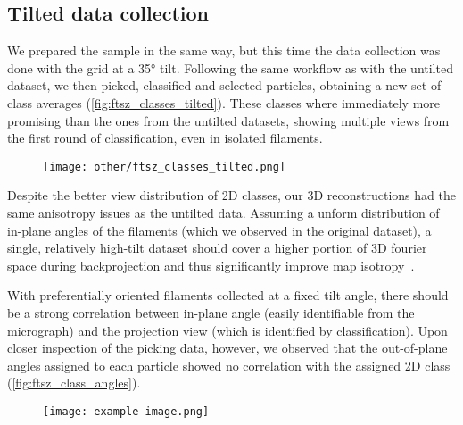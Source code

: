 \subsection{Tilted data collection}\label{ftsz_tilted}

We prepared the sample in the same way, but this time the data collection was done with the grid at a 35° tilt.
Following the same workflow as with the untilted dataset, we then picked, classified and selected particles, obtaining a new set of class averages (\autoref{fig:ftsz_classes_tilted}).
These classes where immediately more promising than the ones from the untilted datasets, showing multiple views from the first round of classification, even in isolated filaments. %

\begin{figure}[ht]
    \centering
    \texttt{[image: other/ftsz\_classes\_tilted.png]}
    \label{fig:ftsz_classes_tilted}
\end{figure}

Despite the better view distribution of 2D classes, our 3D reconstructions had the same anisotropy issues as the untilted data.
Assuming a unform distribution of in-plane angles of the filaments (which we observed in the original dataset), a single, relatively high-tilt dataset should cover a higher portion of 3D fourier space during backprojection and thus significantly improve map isotropy~\cite{tanAddressingPreferredSpecimen2017}.

With preferentially oriented filaments collected at a fixed tilt angle, there should be a strong correlation between in-plane angle (easily identifiable from the micrograph) and the projection view (which is identified by classification). %
Upon closer inspection of the picking data, however, we observed that the out-of-plane angles assigned to each particle showed no correlation with the assigned 2D class (\autoref{fig:ftsz_class_angles}).

\begin{figure}[ht]
    \centering
    \texttt{[image: example-image.png]}
    \label{fig:ftsz_class_angles}
\end{figure}

